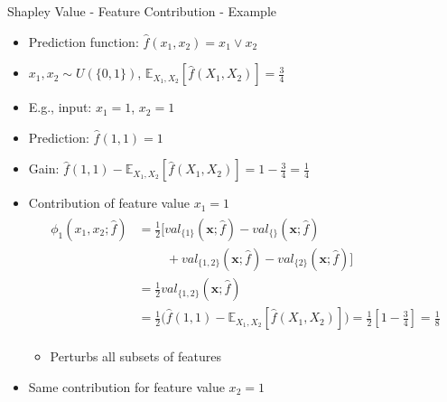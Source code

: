 \begin{frame}[shrink=3]{Shapley Value - Feature Contribution - Example}
	\begin{itemize}
		\item<1-> Prediction function: $\hat{f}(x_1, x_2) = x_1 \lor x_2$
		\item<1-> $x_1, x_2 \sim U(\{0, 1\})$, $\mathbb{E}_{X_1,X_2}\left[\hat{f}(X_1,X_2)\right] = \frac{3}{4}$
		\vspace{1em}
		\item<2-> E.g., input: $x_1 = 1$, $x_2 = 1$
		\item<2-> Prediction: $\hat{f}(1, 1) = 1$
		\item<2-> Gain: $\hat{f}(1, 1) - \mathbb{E}_{X_1,X_2}\left[\hat{f}(X_1,X_2)\right] = 1 - \frac{3}{4} = \frac{1}{4}$
		\vspace{1em}
		\item<3-> Contribution of feature value $x_1 = 1$
		\begin{align}\begin{split}
				\phi_1\left(x_1, x_2;\hat{f}\right)
				&=\frac{1}{2} \biggl[val_{\{1\}}\left(\bm{x};\hat{f}\right)-val_{\{\}}\left(\bm{x};\hat{f}\right)\\
				&\;\;\;\;\;\;\;\;+val_{\{1,2\}}\left(\bm{x};\hat{f}\right)-val_{\{2\}}\left(\bm{x};\hat{f}\right)\biggr]\\
				&=\frac{1}{2} val_{\{1,2\}}\left(\bm{x};\hat{f}\right)\\
				&=\frac{1}{2} \biggl(\hat{f}(1, 1) - \mathbb{E}_{X_1,X_2}\left[\hat{f}(X_1,X_2)\right]\biggr)
				=\frac{1}{2} \left[1 - \frac{3}{4}\right] = \frac{1}{8}
		\end{split}\end{align}
		\vspace{-0.5em}
		\begin{itemize}
			\item<3-> Perturbs all subsets of features
		\end{itemize}
		\item<4-> Same contribution for feature value $x_2 = 1$
	\end{itemize}
\end{frame}


